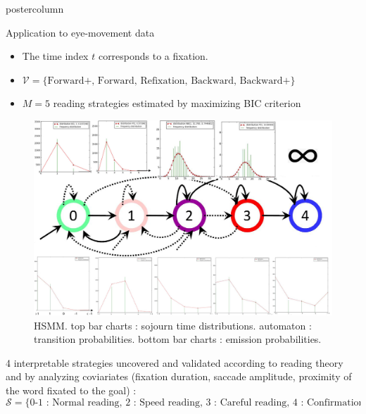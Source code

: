 \documentclass[final,hyperref={pdfpagelabels=false}]{beamer}
\begin{document}
\begin{frame}
\begin{columns}
\begin{column}{.50\textwidth}
\begin{beamercolorbox}[center,wd=\textwidth]{postercolumn}
\begin{minipage}[T]{.98\textwidth}
{            \vfill
            \begin{block}{Application to eye-movement data}
                \begin{itemize}
                    \item[\bullet] The time index $t$ corresponds to a fixation.
                    \item[\bullet] $\mathcal{V} = \{\text{Forward+, Forward, Refixation, Backward, Backward+}\}$
                    \item[\bullet] $M = 5$ reading strategies estimated by maximizing BIC criterion
                \end{itemize}
                \begin{figure}[h]
                    \centering
                    \includegraphics[width=29.75cm]{hsmm.jpg}
                    \caption{HSMM. top bar charts : sojourn time distributions.
                    automaton : transition probabilities.
                    bottom bar charts : emission probabilities.}
                \end{figure}
                4 interpretable strategies uncovered and validated according to reading theory and by analyzing coviariates
                (fixation duration, saccade amplitude, proximity of the word fixated to the goal) :
                {\small$$\mathcal{S}=\{\text{0-1 : Normal reading, 2 : Speed reading, 3 : Careful reading, 4 : Confirmation}\}$$}
                \begin{minipage}{0.47\textwidth}
                    \begin{figure}[h]
                        \centering

\end{figure}
\end{minipage}
\end{block}}
\end{minipage}
\end{beamercolorbox}
\end{column}
\end{columns}
\end{frame}
\end{document}
